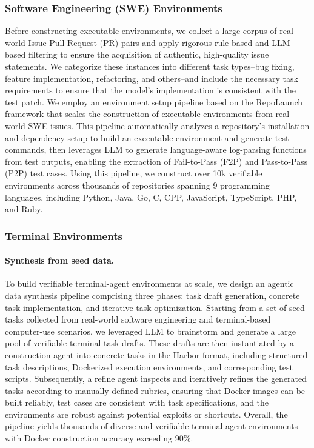\documentclass{article}
\theoremstyle{definition}
\begin{document}
\subsubsection{Software Engineering (SWE) Environments} 
Before constructing executable environments, we collect a large corpus of real-world Issue-Pull Request (PR) pairs and apply rigorous rule-based and LLM-based filtering to ensure the acquisition of authentic, high-quality issue statements. We categorize these instances into different task types--bug fixing, feature implementation, refactoring, and others--and include the necessary task requirements to ensure that the model's implementation is consistent with the test patch. We employ an environment setup pipeline based on the RepoLaunch~\citep{zhang2025swebenchgoeslive} framework that scales the construction of executable environments from real-world SWE issues. This pipeline automatically analyzes a repository’s installation and dependency setup to build an executable environment and generate test commands, then leverages LLM to generate language-aware log-parsing functions from test outputs, enabling the extraction of  Fail-to-Pass (F2P) and Pass-to-Pass (P2P) test cases. Using this pipeline, we construct over 10k verifiable environments across thousands of repositories spanning 9 programming languages, including Python, Java, Go, C, CPP, JavaScript, TypeScript, PHP, and Ruby. 

\subsubsection{Terminal Environments} 

\paragraph{Synthesis from seed data.} To build verifiable terminal-agent environments at scale, we design an agentic data synthesis pipeline comprising three phases: task draft generation, concrete task implementation, and iterative task optimization. Starting from a set of seed tasks collected from real-world software engineering and terminal-based computer-use scenarios, we leveraged LLM to brainstorm and generate a large pool of verifiable terminal-task drafts. These drafts are then instantiated by a construction agent into concrete tasks in the Harbor \cite{harborframeworkteam2026harborframework} format, including structured task descriptions, Dockerized execution environments, and corresponding test scripts. Subsequently, a refine agent inspects and iteratively refines the generated tasks according to manually defined rubrics, ensuring that Docker images can be built reliably, test cases are consistent with task specifications, and the environments are robust against potential exploits or shortcuts. Overall, the pipeline yields thousands of diverse and verifiable terminal-agent environments with Docker construction accuracy exceeding 90\%. 
\end{document}
